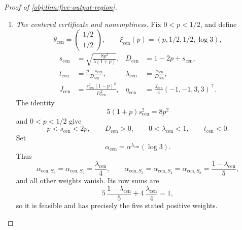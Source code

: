 \begin{proof}[Proof of \cref{obj:thm:five-output-region}]
\begin{enumerate}
All pattern masses stay positive nearby. Hence the finitely many
information functions, projected scores, and dual-ray values are
continuous at \(\xi_\circ\). The strict inactive slacks and nonzero score
differences therefore persist simultaneously:
\[
\begin{gathered}
f_S(\xi,t_\sigma(\xi))
<
b_S(\varepsilon)^\top\eta(\xi)
\quad(S\notin\mathcal K_5),\\
\rho_S(\xi,t_\sigma(\xi))
\ne\rho_T(\xi,t_\sigma(\xi))
\quad(S,T\in\mathcal K_5,\ S\ne T).
\end{gathered}
\]
The strict interior inequalities, the branch denominator, and the
derivative difference likewise persist. For every point in the resulting
neighborhood, choose
\[
\alpha(\xi)=\alpha^{u_\sigma(\xi)}(\varepsilon).
\]
The normalization calculation gives feasibility and five positive
weights, while the defining formula for \(u_\sigma\) gives
\[
\partial_tF_{\theta(\xi)}
\bigl(\alpha(\xi),t_\sigma(\xi)\bigr)=0.
\]
Together with the continued dual equalities, strict slacks, and score
separation, these are all the certificate conditions. Every point of
\(\mathcal R_5\) consequently has a neighborhood in \(\mathbb R^4\)
contained in \(\mathcal R_5\), proving openness.

\item \textit{The centered certificate and nonemptiness.}
Fix \(0<p<1/2\), and define
\[
\theta_{\mathrm{cen}}=\begin{pmatrix}1/2\\1/2\end{pmatrix},
\qquad
\xi_{\mathrm{cen}}(p)=(p,1/2,1/2,\log3),
\]
\[
\begin{aligned}
s_{\mathrm{cen}}&=\sqrt{\frac{8p^2}{5(1+p)}},
&
D_{\mathrm{cen}}&=1-2p+s_{\mathrm{cen}},\\
t_{\mathrm{cen}}&=\frac{p-s_{\mathrm{cen}}}{D_{\mathrm{cen}}},
&
\lambda_{\mathrm{cen}}&=\frac{s_{\mathrm{cen}}}{D_{\mathrm{cen}}},\\
J_{\mathrm{cen}}&=\frac{s_{\mathrm{cen}}^2(1-p)^2}{D_{\mathrm{cen}}^2},
&
\eta_{\mathrm{cen}}&=\frac{J_{\mathrm{cen}}}{4}(-1,-1,3,3)^\top.
\end{aligned}
\]
The identity
\[
5(1+p)s_{\mathrm{cen}}^2=8p^2
\]
and \(0<p<1/2\) give
\[
p<s_{\mathrm{cen}}<2p,\qquad
D_{\mathrm{cen}}>0,\qquad
0<\lambda_{\mathrm{cen}}<1,\qquad
t_{\mathrm{cen}}<0.
\]
Set
\[
\alpha_{\mathrm{cen}}=\alpha^{\lambda_{\mathrm{cen}}}(\log3).
\]
Thus
\[
\alpha_{\mathrm{cen},S_6}
=\alpha_{\mathrm{cen},S_9}=\frac{\lambda_{\mathrm{cen}}}{4},
\qquad
\alpha_{\mathrm{cen},S_3}
=\alpha_{\mathrm{cen},S_4}
=\alpha_{\mathrm{cen},S_8}
=\frac{1-\lambda_{\mathrm{cen}}}{5},
\]
and all other weights vanish. Its row sums are
\[
5\,\frac{1-\lambda_{\mathrm{cen}}}{5}
+
4\,\frac{\lambda_{\mathrm{cen}}}{4}=1,
\]
so it is feasible and has precisely the five stated positive weights.


\end{enumerate}
\end{proof}
